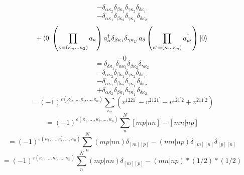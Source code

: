 \documentclass[12pt]{article}
\begin{document}
\begin{equation}
    -\delta _{\alpha  \kappa _{2}}\delta _{\beta  \kappa _{1}}\delta _{\gamma  \kappa _{2}}\delta _{\delta  \kappa _{1^{\prime}}}
\end{equation}
\begin{equation}
    -\delta _{\alpha  \kappa _{1}}\delta _{\beta  \kappa _{2}}\delta _{\gamma  \kappa _{1^{\prime}}}\delta _{\delta  \kappa _{2}}
\end{equation}
\begin{equation}
    +\bra{0}\left(\prod_{\kappa=\left(\kappa_{n}\dots\kappa_{2}\right)}a_{\kappa}\right)
        a^{\dag}_{\alpha }\delta _{\beta  \kappa _{1}}\delta _{\gamma  \kappa _{1^{\prime}}}a_{\delta }
    \left(\prod_{\kappa^{\prime}=\left(\kappa_{}\dots\kappa_{n}\right)}a^{\dag}_{\kappa^{\prime}}\right)\ket{0}
\end{equation}
\begin{equation}
    -0
\end{equation}
\begin{equation}
    =\delta _{\delta  \kappa _{1^{\prime}}}\delta _{\alpha  \kappa _{1}}\delta _{\beta  \kappa _{2}}\delta _{\gamma  \kappa _{2}}
\end{equation}
\begin{equation}
    -\delta _{\alpha  \kappa _{2}}\delta _{\beta  \kappa _{1}}\delta _{\gamma  \kappa _{2}}\delta _{\delta  \kappa _{1^{\prime}}}
\end{equation}
\begin{equation}
    -\delta _{\alpha  \kappa _{1}}\delta _{\beta  \kappa _{2}}\delta _{\gamma  \kappa _{1^{\prime}}}\delta _{\delta  \kappa _{2}}
\end{equation}
\begin{equation}
    +\delta _{\alpha  \kappa _{2}}\delta _{\beta  \kappa _{1}}\delta _{\gamma  \kappa _{1^{\prime}}}\delta _{\delta  \kappa _{2}}
\end{equation}
\begin{equation}
    =\left(-1\right)^{\varepsilon\left(\kappa_{1},\dots,\kappa_{i}^{\prime},\dots,\kappa_{n}\right)}\sum_{\kappa _{2}} \left(v^{1221^{\prime}}-v^{2121^{\prime}}-v^{121^{\prime}2}+v^{211^{\prime}2}\right)
\end{equation}
\begin{equation}
    =\left(-1\right)^{\varepsilon\left(\kappa_{1},\dots,\kappa_{i}^{\prime},\dots,\kappa_{n}\right)}\sum_{n}^{N} [mp|nn]-[mn|np]
\end{equation}
\begin{equation}
    =\left(-1\right)^{\varepsilon\left(\kappa_{1},\dots,\kappa_{i}^{\prime},\dots,\kappa_{n}\right)}\sum_{n}^{N} (mp|nn)\delta _{[m][p]}-(mn|np)\delta _{[m][n]}\delta _{[p][n]}
\end{equation}
\begin{equation}
    =\left(-1\right)^{\varepsilon\left(\kappa_{1},\dots,\kappa_{i}^{\prime},\dots,\kappa_{n}\right)}\sum_{n}^{N} (mp|nn)\delta _{[m][p]}-(mn|np)*
(1/2)*(1/2)
\end{equation}
\end{document}
